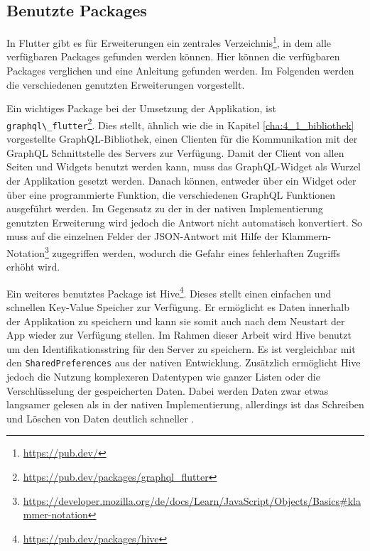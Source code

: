 \subsection{Benutzte Packages}
\label{cha:4_3_2}
In Flutter gibt es für Erweiterungen ein zentrales Verzeichnis\footnote{\url{https://pub.dev/}}, in dem alle verfügbaren Packages gefunden werden können. Hier können die verfügbaren Packages verglichen und eine Anleitung gefunden werden. Im Folgenden werden die verschiedenen genutzten Erweiterungen vorgestellt.

Ein wichtiges Package bei der Umsetzung der Applikation, ist \verb|graphql\_flutter|\footnote{\url{https://pub.dev/packages/graphql\_flutter}}. 
Dies stellt, ähnlich wie die in Kapitel \ref{cha:4_1_bibliothek} vorgestellte GraphQL-Bibliothek, einen Clienten für die Kommunikation mit der GraphQL Schnittstelle des Servers zur Verfügung.
Damit der Client von allen Seiten und Widgets benutzt werden kann, muss das GraphQL-Widget als Wurzel der Applikation gesetzt werden. Danach können, entweder über ein Widget oder über eine programmierte Funktion, die verschiedenen GraphQL Funktionen ausgeführt werden. 
Im Gegensatz zu der in der nativen Implementierung genutzten Erweiterung wird jedoch die Antwort nicht automatisch konvertiert. So muss auf die einzelnen Felder der JSON-Antwort mit Hilfe der Klammern-Notation\footnote{\url{https://developer.mozilla.org/de/docs/Learn/JavaScript/Objects/Basics\#klammer-notation}} zugegriffen werden, wodurch die Gefahr eines fehlerhaften Zugriffs erhöht wird.

Ein weiteres benutztes Package ist Hive\footnote{\url{https://pub.dev/packages/hive}}. Dieses stellt einen einfachen und schnellen Key-Value Speicher zur Verfügung. Er ermöglicht es Daten innerhalb der Applikation zu speichern und kann sie somit auch nach dem Neustart der App wieder zur Verfügung stellen. Im Rahmen dieser Arbeit wird Hive benutzt um den Identifikationsstring für den Server zu speichern. Es ist vergleichbar mit den \verb|SharedPreferences| aus der nativen Entwicklung. Zusätzlich ermöglicht Hive jedoch die Nutzung komplexeren Datentypen wie ganzer Listen oder die Verschlüsselung der gespeicherten Daten. Dabei werden Daten zwar etwas langsamer gelesen als in der nativen Implementierung, allerdings ist das Schreiben und Löschen von Daten deutlich schneller \cite{hive_vs_sharedPrefernces}.

